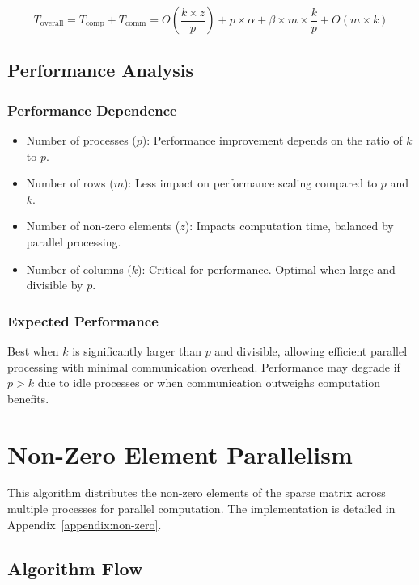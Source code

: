 \documentclass[12pt,oneside]{book} %
\begin{document}
\begin{equation}
    T_{\text{overall}} = T_{\text{comp}} + T_{\text{comm}} = O\left(\frac{k \times z}{p}\right) + p \times \alpha + \beta \times m \times \frac{k}{p} + O(m \times k)
\end{equation}

\subsection{Performance Analysis}
\subsubsection{Performance Dependence}
\begin{itemize}
    \item Number of processes ($p$): Performance improvement depends on the ratio of $k$
          to $p$.
    \item Number of rows ($m$): Less impact on performance scaling compared to $p$ and
          $k$.
    \item Number of non-zero elements ($z$): Impacts computation time, balanced by
          parallel processing.
    \item Number of columns ($k$): Critical for performance. Optimal when large and
          divisible by $p$.
\end{itemize}

\subsubsection{Expected Performance}
Best when $k$ is significantly larger than $p$ and divisible, allowing
efficient parallel processing with minimal communication overhead. Performance
may degrade if $p > k$ due to idle processes or when communication outweighs
computation benefits.

\newpage
\section{Non-Zero Element Parallelism}
This algorithm distributes the non-zero elements of the sparse matrix across
multiple processes for parallel computation. The implementation is detailed in
Appendix~\ref{appendix:non-zero}.

\subsection{Algorithm Flow}
\end{document}

